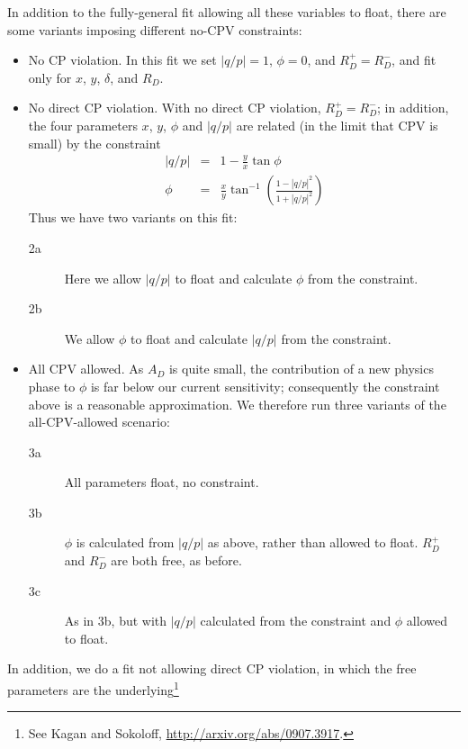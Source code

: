In addition to the fully-general fit allowing all these variables to float, 
there are some variants imposing different no-CPV constraints:
\begin{itemize}
\item No CP violation. In this fit we set $|q/p|=1$, $\phi=0$, and $R_D^+=R_D^-$, 
and fit only for $x$, $y$, $\delta$, and $R_D$. 
\item No direct CP violation. With no direct CP violation, $R_D^+=R_D^-$;
in addition, the four parameters $x$, $y$, $\phi$ and $|q/p|$ are related 
(in the limit that CPV is small) by the constraint
\begin{eqnarray}
|q/p| &=& 1 - \frac{y}{x}\tan\phi\\
\phi &=& \frac{x}{y}\tan^{-1}\left(\frac{1-|q/p|^2}{1+|q/p|^2}\right)
\end{eqnarray}
Thus we have two variants on this fit:
\begin{description}
\item[2a] Here we allow $|q/p|$ to float and calculate $\phi$
from the constraint. 
\item[2b] We allow $\phi$ to float and calculate $|q/p|$ from the constraint. 
\end{description}
\item All CPV allowed. As $A_D$ is quite
small, the contribution of a new physics phase to $\phi$ is far below
our current sensitivity; consequently the constraint above is a reasonable
approximation. We therefore run three variants of the all-CPV-allowed 
scenario:
\begin{description}
\item[3a] All parameters float, no constraint.
\item[3b] $\phi$ is calculated from $|q/p|$ as above, rather than allowed to float.
$R_D^+$ and $R_D^-$ are both free, as before.
\item[3c] As in 3b, but with $|q/p|$ calculated from the constraint and $\phi$ allowed
to float.
\end{description}
\end{itemize}

In addition, we do a fit not allowing direct CP violation, in which the
free parameters are the underlying\footnote{See Kagan and Sokoloff, \url{http://arxiv.org/abs/0907.3917}.}
